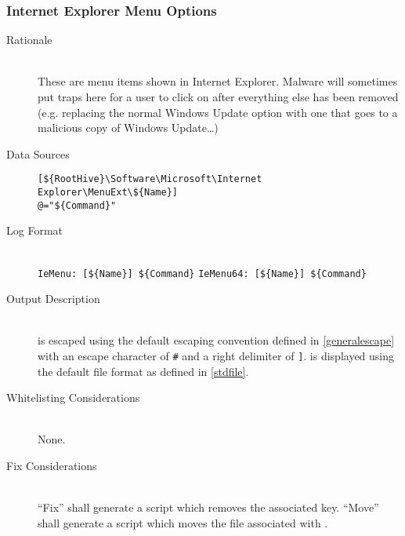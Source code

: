 \subsubsection{Internet Explorer Menu Options}
\begin{description}
\item[Rationale] \hfill \\
These are menu items shown in Internet Explorer. Malware will sometimes put
traps here for a user to click on after everything else has been removed (e.g.
replacing the normal Windows Update option with one that goes to a malicious
copy of Windows Update\ldots)
\item[Data Sources] \hfill
\begin{verbatim}
[${RootHive}\Software\Microsoft\Internet Explorer\MenuExt\${Name}]
@="${Command}"
\end{verbatim}
\item[Log Format] \hfill \\
\verb|IeMenu: [${Name}] ${Command}|
\verb|IeMenu64: [${Name}] ${Command}|
\item[Output Description] \hfill \\
 is escaped using the default escaping convention defined in
\ref{generalescape} with an escape character of \verb|#| and a right delimiter
of \verb|]|.  is displayed using the default file format as defined
in \ref{stdfile}.
\item[Whitelisting Considerations] \hfill \\
None.
\item[Fix Considerations] \hfill \\
``Fix'' shall generate a script which removes the associated key. ``Move'' shall
generate a script which moves the file associated with .
\end{description}

